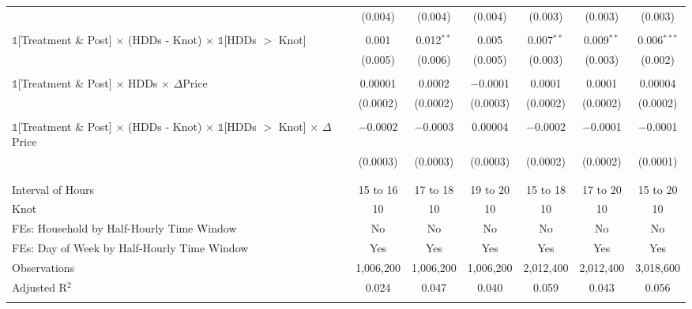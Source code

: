 \begin{table}[!htbp]
\begin{longtable}{@{\extracolsep{15pt}}lcccccc}
  & (0.004) & (0.004) & (0.004) & (0.003) & (0.003) & (0.003) \\ 
  & & & & & & \\ 
 $\mathbb{1}$[Treatment \& Post] $\times$ (HDDs - Knot) $\times$ $\mathbb{1}$[HDDs $>$ Knot] & 0.001 & 0.012$^{**}$ & 0.005 & 0.007$^{**}$ & 0.009$^{**}$ & 0.006$^{***}$ \\ 
  & (0.005) & (0.006) & (0.005) & (0.003) & (0.003) & (0.002) \\ 
  & & & & & & \\ 
 $\mathbb{1}$[Treatment \& Post] $\times$ HDDs $\times$ $\Delta$Price & 0.00001 & 0.0002 & $-$0.0001 & 0.0001 & 0.0001 & 0.00004 \\ 
  & (0.0002) & (0.0002) & (0.0003) & (0.0002) & (0.0002) & (0.0002) \\ 
  & & & & & & \\ 
 $\mathbb{1}$[Treatment \& Post] $\times$ (HDDs - Knot) $\times$ $\mathbb{1}$[HDDs $>$ Knot] $\times$ $\Delta$Price & $-$0.0002 & $-$0.0003 & 0.00004 & $-$0.0002 & $-$0.0001 & $-$0.0001 \\ 
  & (0.0003) & (0.0003) & (0.0003) & (0.0002) & (0.0002) & (0.0001) \\ 
  & & & & & & \\ 
\hline \\[-1.8ex] 
Interval of Hours & 15 to 16 & 17 to 18 & 19 to 20 & 15 to 18 & 17 to 20 & 15 to 20 \\ 
Knot & 10 & 10 & 10 & 10 & 10 & 10 \\ 
FEs: Household by Half-Hourly Time Window & No & No & No & No & No & No \\ 
FEs: Day of Week by Half-Hourly Time Window & Yes & Yes & Yes & Yes & Yes & Yes \\ 
Observations & 1,006,200 & 1,006,200 & 1,006,200 & 2,012,400 & 2,012,400 & 3,018,600 \\ 
Adjusted R$^{2}$ & 0.024 & 0.047 & 0.040 & 0.059 & 0.043 & 0.056 \\ 
\hline 
\hline \\[-1.8ex] 
\end{longtable} 
\end{table} 

